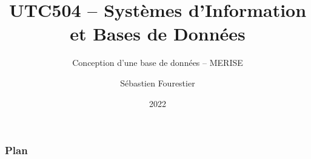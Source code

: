 \documentclass{beamer}
\title{UTC504 -- Systèmes d'Information et Bases de Données}
\subtitle{Conception d'une base de données -- MERISE}
\author{Sébastien Fourestier}
\date{2022}
\newcommand{\plan}
{
  \begin{frame}
    \frametitle{Plan}
    \tableofcontents
  \end{frame}
}
\begin{document}
\begin{frame}
\titlepage
\end{frame}

\plan





\end{document}
